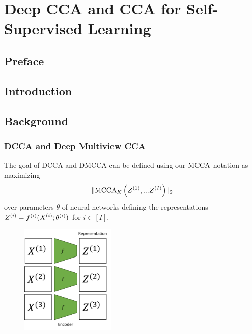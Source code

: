 \graphicspath{{chapters/deep_learning/}}


\chapter{Deep CCA and CCA for Self-Supervised Learning}\label{chap:deep_learning}
\minitoc
\section*{Preface}

\section{Introduction}

\section{Background}

\subsection{DCCA and Deep Multiview CCA}

The goal of DCCA and DMCCA can be defined using our $\operatorname{MCCA}$ notation as maximizing
\begin{align}
    \label{eq:DMCCA-def}
    \lVert\operatorname{MCCA}_K\left(Z^{(1)}, ... Z^{(I)}\right)\rVert_2
\end{align}
over parameters $\theta$ of neural networks defining the representations $Z^{(i)}=f^{(i)}(X^{(i)};\theta^{(i)})$ for $i\in[I]$.

\begin{figure}
    \centering
    \includegraphics[width=0.4\textwidth]{figures/dcca_schematic}
\end{figure}

